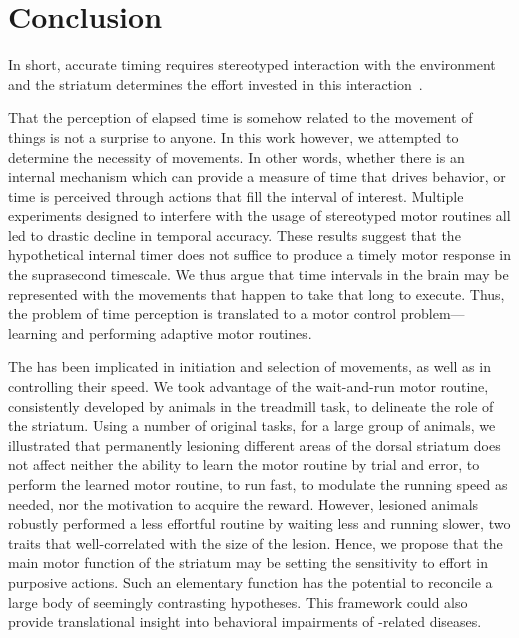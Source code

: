 \section{Conclusion} \label{ch:discussion:conclusion}

In short, accurate timing requires stereotyped interaction with the environment and the striatum determines the effort invested in this interaction~\cite{Safaie2020PNAS,JuradoParras2020}.
\par
That the perception of elapsed time is somehow related to the movement of things is not a surprise to anyone.
In this work however, we attempted to determine the necessity of movements.
In other words, whether there is an internal mechanism which can provide a measure of time that drives behavior, or time is perceived through actions that fill the interval of interest.
Multiple experiments designed to interfere with the usage of stereotyped motor routines all led to drastic decline in temporal accuracy.
These results suggest that the hypothetical internal timer does not suffice to produce a timely motor response in the suprasecond timescale.
We thus argue that time intervals in the brain may be represented with the movements that happen to take that long to execute.
Thus, the problem of time perception is translated to a motor control problem---learning and performing adaptive motor routines.
\par
The  has been implicated in initiation and selection of movements, as well as in controlling their speed.
We took advantage of the wait-and-run motor routine, consistently developed by animals in the treadmill task, to delineate the role of the striatum.
Using a number of original tasks, for a large group of animals, we illustrated that permanently lesioning different areas of the dorsal striatum does not affect neither the ability to learn the motor routine by trial and error, to perform the learned motor routine, to run fast, to modulate the running speed as needed, nor the motivation to acquire the reward.
However, lesioned animals robustly performed a less effortful routine by waiting less and running slower, two traits that well-correlated with the size of the lesion.
Hence, we propose that the main motor function of the striatum may be setting the sensitivity to effort in purposive actions.
Such an elementary function has the potential to reconcile a large body of seemingly contrasting hypotheses.
This framework could also provide translational insight into behavioral impairments of -related diseases.